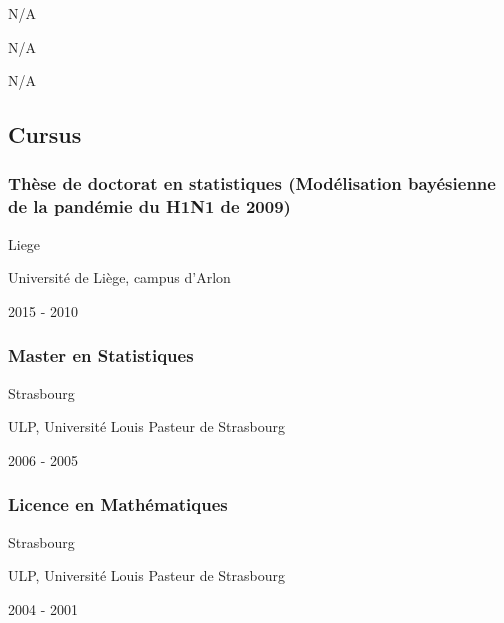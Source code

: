 \documentclass[]{article}
\begin{document}
N/A

N/A

N/A

\hypertarget{cursus}{%
\subsection{Cursus}\label{cursus}}

\hypertarget{thuxe8se-de-doctorat-en-statistiques-moduxe9lisation-bayuxe9sienne-de-la-panduxe9mie-du-h1n1-de-2009}{%
\subsubsection{Thèse de doctorat en statistiques (Modélisation
bayésienne de la pandémie du H1N1 de
2009)}\label{thuxe8se-de-doctorat-en-statistiques-moduxe9lisation-bayuxe9sienne-de-la-panduxe9mie-du-h1n1-de-2009}}

Liege

Université de Liège, campus d'Arlon

2015 - 2010

\hypertarget{master-en-statistiques}{%
\subsubsection{Master en Statistiques}\label{master-en-statistiques}}

Strasbourg

ULP, Université Louis Pasteur de Strasbourg

2006 - 2005

\hypertarget{licence-en-mathuxe9matiques}{%
\subsubsection{Licence en
Mathématiques}\label{licence-en-mathuxe9matiques}}

Strasbourg

ULP, Université Louis Pasteur de Strasbourg

2004 - 2001
\end{document}
